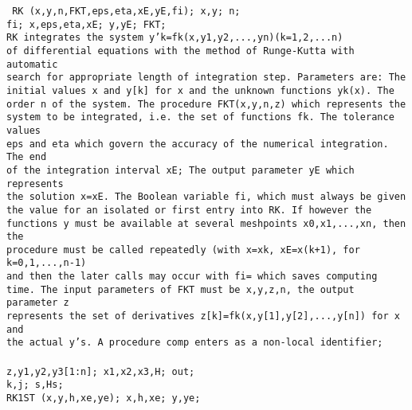 \documentclass[a4paper,11pt]{article}
\begin{document}
\begin{flushleft}
{\tt {} RK (x,y,n,FKT,eps,eta,xE,yE,fi);  x,y;  n;\\
 fi;  x,eps,eta,xE;  y,yE;  FKT;\\
 RK integrates the system y'k=fk(x,y1,y2,...,yn)(k=1,2,...n)\\
of differential equations with the method of Runge-Kutta with automatic\\
search for appropriate length of integration step. Parameters are: The\\
initial values x and y[k] for x and the unknown functions yk(x). The\\
order n of the system. The procedure FKT(x,y,n,z) which represents the\\
system to be integrated, i.e. the set of functions fk. The tolerance values\\
eps and eta which govern the accuracy of the numerical integration. The end\\
of the integration interval xE; The output parameter yE which represents\\
the solution x=xE. The Boolean variable fi, which must always be given \\
the value  for an isolated or first entry into RK. If however the\\
functions y must be available at several meshpoints x0,x1,...,xn, then the\\
procedure must be called repeatedly (with x=xk, xE=x(k+1), for k=0,1,...,n-1)\\
and then the later calls may occur with fi= which saves computing\\
time. The input parameters of FKT must be x,y,z,n, the output parameter z\\
represents the set of derivatives z[k]=fk(x,y[1],y[2],...,y[n]) for x and\\
the actual y's. A procedure comp enters as a non-local identifier;\\
\vspace{1.0em}
\\
\hspace{1.0cm} z,y1,y2,y3[1:n];  x1,x2,x3,H;  out;\\
\hspace{1.0cm} k,j;   s,Hs;\\
\hspace{1.0cm} RK1ST (x,y,h,xe,ye);  x,h,xe;  y,ye;\\
}
\end{flushleft}
\end{document}
